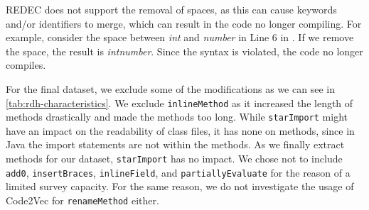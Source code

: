 \documentclass[%
class=scrreprt,
chapterprefix=false,%
open=right,%
twoside=true,%
paper=a4,%
logofile={Logo\_zentral\_farbig\_EN.png},%
thesistype=master,%
UKenglish,%
]{se2thesis}
\theoremstyle{definition}
\newcommand{\rdh}{REDEC\xspace}
\begin{document}
	
	\rdh does not support the removal of spaces, as this can cause keywords and/or identifiers to merge, which can result in the code no longer compiling.
	For example, consider the space between \textit{int} and \textit{number} in Line 6 in . If we remove the space, the result is \textit{intnumber}. Since the syntax is violated, the code no longer compiles.
	

	For the final dataset, we exclude some of the modifications as we can see in \autoref{tab:rdh-characteristics}.
	We exclude \texttt{inlineMethod} as it increased the length of methods drastically and made the methods too long.
	While \texttt{starImport} might have an impact on the readability of class files, it has none on methods, since in Java the import statements are not within the methods. As we finally extract methods for our dataset, \texttt{starImport} has no impact.
	We chose not to include \texttt{add0}, \texttt{insertBraces}, \texttt{inlineField}, and \texttt{partiallyEvaluate} for the reason of a limited survey capacity.
	For the same reason, we do not investigate the usage of Code2Vec for \texttt{renameMethod} either.
\end{document}
